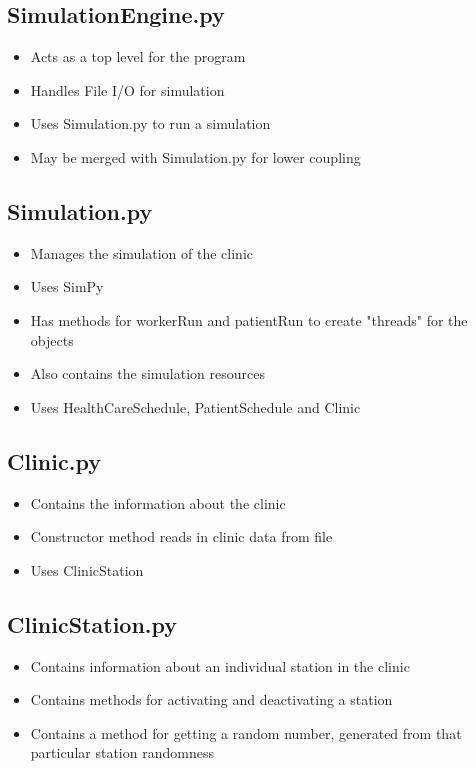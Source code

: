 \documentclass[12pt]{article}
\begin{document}
\subsection{SimulationEngine.py}
\begin{itemize}  
\item Acts as a top level for the program
\item Handles File I/O for simulation
\item Uses Simulation.py to run a simulation
\item May be merged with Simulation.py for lower coupling
\end{itemize}

\subsection{Simulation.py}
\begin{itemize}  
\item Manages the simulation of the clinic
\item Uses SimPy
\item Has methods for workerRun and patientRun to create "threads" for the objects
\item Also contains the simulation resources
\item Uses HealthCareSchedule, PatientSchedule and Clinic
\end{itemize}

\subsection{Clinic.py}
\begin{itemize}  
\item Contains the information about the clinic
\item Constructor method reads in clinic data from file
\item Uses ClinicStation
\end{itemize}

\subsection{ClinicStation.py}
\begin{itemize}  
\item Contains information about an individual station in the clinic
\item Contains methods for activating and deactivating a station
\item Contains a method for getting a random number, generated from that particular station randomness
\end{itemize}
\end{document}
